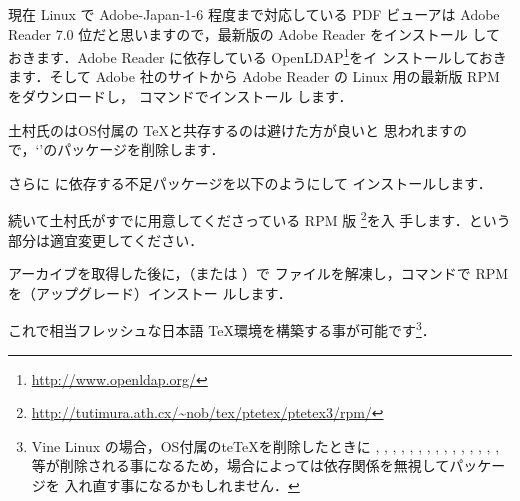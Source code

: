 現在 Linux で Adobe-Japan-1-6 程度まで対応している PDF ビューアは Adobe
Reader 7.0 位だと思いますので，最新版の Adobe Reader をインストール
しておきます．Adobe Reader に依存している OpenLDAP\footnote{\url{http://www.openldap.org/}}をイ
ンストールしておきます．そして Adobe 社のサイトから Adobe Reader の
Linux 用の最新版 RPM をダウンロードし， コマンドでインストール
します．
\begin{InTerm}
\end{InTerm}
土村氏の\ptetex はOS付属の \TeX と共存するのは避けた方が良いと
思われますので，`'のパッケージを削除します．
\begin{InTerm}
\end{InTerm}
さらに \ptetex に依存する不足パッケージを以下のようにして
インストールします．
\begin{InTerm}
\end{InTerm}
続いて土村氏がすでに用意してくださっている RPM 版
\footnote{\url{http://tutimura.ath.cx/~nob/tex/ptetex/ptetex3/rpm/}}を入
手します．という部分は適宜変更してください．
\begin{InTerm}
\end{InTerm}
アーカイブを取得した後に，（または ）で
ファイルを解凍し，コマンドで RPM を（アップグレード）インストー
ルします．
\begin{InTerm}
\end{InTerm}
これで相当フレッシュな日本語 \TeX 環境を構築する事が可能です\footnote{
Vine Linux の場合，OS付属のte\TeX を削除したときに
, , , ,
, , , , 
, , , ,
, , , 
等が削除される事になるため，場合によっては依存関係を無視してパッケージを
入れ直す事になるかもしれません．}．

